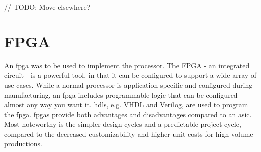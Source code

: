 // TODO: Move elsewhere?
\section{FPGA}
An \gls{fpga} was to be used to implement the processor.
The FPGA - an integrated circuit - is a powerful tool, in that it can be configured to support a wide array of use cases.
While a normal processor is application specific and configured during manufacturing, an \gls{fpga} includes programmable logic that can be configured almost any way you want it\cite{fpga}.
\gls{hdl}s, e.g. VHDL and Verilog, are used to program the \gls{fpga}.
\gls{fpga}s provide both advantages and disadvantages compared to an \gls{asic}.
Most noteworthy is the simpler design cycles and a predictable project cycle, compared to the decreased customizability and higher unit costs for high volume productions\cite{fpgavsasic}.
